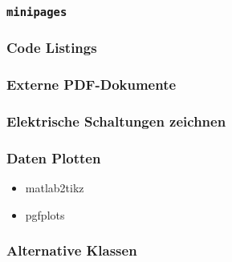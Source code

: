 \documentclass{beamer}                %
\begin{document}
\begin{frame} %
    \frametitle{\texttt{minipages}}
\end{frame}

\begin{frame} %
    \frametitle{Code Listings}
\end{frame}

\begin{frame} %
    \frametitle{Externe PDF-Dokumente}
\end{frame}

\begin{frame} %
    \frametitle{Elektrische Schaltungen zeichnen}
\end{frame}

\begin{frame} %
    \frametitle{Daten Plotten}
    \begin{itemize}
        \item matlab2tikz
        \item pgfplots
    \end{itemize}
\end{frame}

\begin{frame} %
    \frametitle{Alternative Klassen}
\end{frame}
\end{document}
